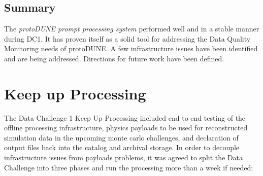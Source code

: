 \documentclass[pdftex,12pt,letter]{article}
\newcommand{\pd}{protoDUNE\xspace}
\begin{document}
\subsection{Summary}
The \textit{ \pd prompt processing system} performed well and in a stable manner during DC1. It has proven itself as a solid tool for addressing the Data Quality Monitoring needs
of \pd. A few infrastructure issues have been identified and are being addressed.
Directions for future work have been defined.
 
 

\section {Keep up Processing}



The Data Challenge 1 Keep Up Processing  included end to end testing of the offline processing infrastructure, physics payloads to be used for reconstructed simulation data in the upcoming monte carlo challenges, and declaration of output files back into the catalog and archival storage.  
In order to decouple infrastructure issues from  payloads problems, it was agreed to split the Data Challenge into three phases and run the processing more than a week if needed:
\end{document}
